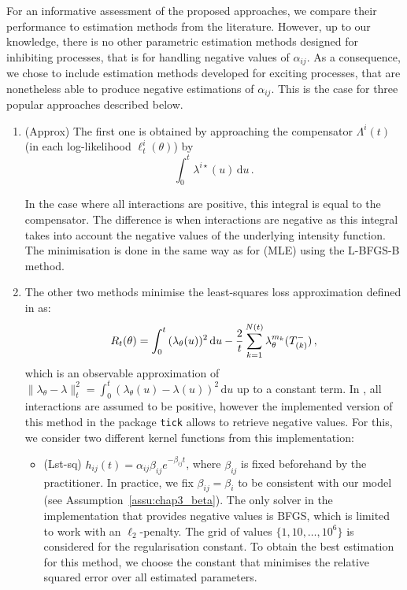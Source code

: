     For an informative assessment of the proposed approaches, we compare their performance to estimation methods from the literature.
    However, up to our knowledge, there is no other parametric estimation methods designed for inhibiting processes, that is for handling negative values of \(\alpha_{ij}\).
    As a consequence, we chose to include estimation methods developed for exciting processes, that are nonetheless able to produce negative estimations of \(\alpha_{ij}\).
    This is the case for three popular approaches described below.

    \begin{enumerate}
        \item (Approx) The first one \parencite{Lemonnier2014} is obtained by approaching the compensator $\Lambda^i(t)$ (in each log-likelihood $\ell^i_t(\theta)$) by \[\int_{0}^{t}{\lambda^{i\star}(u)\,\mathrm{d}u}\,.\]

        In the case where all interactions are positive, this integral is equal to the compensator. The difference is when interactions are negative as this integral takes into account the negative values of the underlying intensity function. The minimisation is done in the same way as for (MLE) using the L-BFGS-B method.

        \item The other two methods minimise the least-squares loss approximation defined in \textcite{Reynaud2014,Bacry2020} as:
        \[R_t(\theta) =  \int_{0}^{t}{(\lambda_{\theta}(u))^2\,\mathrm{d}u} - \frac{2}{t}\sum_{k=1}^{N(t)}{\lambda^{m_k}_{\theta}(T_{(k)}^-)} \,,\]
        which is an observable approximation of \(\|\lambda_\theta - \lambda\|_t^2 = \int_0^t (\lambda_\theta(u) - \lambda(u))^2 \, \mathrm du\) up to a constant term.
        In \textcite{Bacry2020}, all interactions are assumed to be positive, however the implemented version of this method in the package \texttt{tick} \textcite{Bacry2018} allows to retrieve negative values. For this, we consider two different kernel functions from this implementation:
        \begin{itemize}
        \item (Lst-sq) $h_{ij}(t) = \alpha_{ij}\beta_{ij}e^{-\beta_{ij}t}$, where $\beta_{ij}$ is fixed beforehand by the practitioner. In practice, we fix $\beta_{ij} = \beta_i$ to be consistent with our model (see Assumption~\ref{assu:chap3_beta}). The only solver in the implementation that provides negative values is BFGS,
        which is limited to work with an $\ell_2$-penalty. The grid of values $\{1, 10, \ldots, 10^6\}$ is considered for the regularisation constant. To obtain the best estimation for this method, we choose the constant that minimises the relative squared error over all estimated parameters. 
        

\end{itemize}
\end{enumerate}
